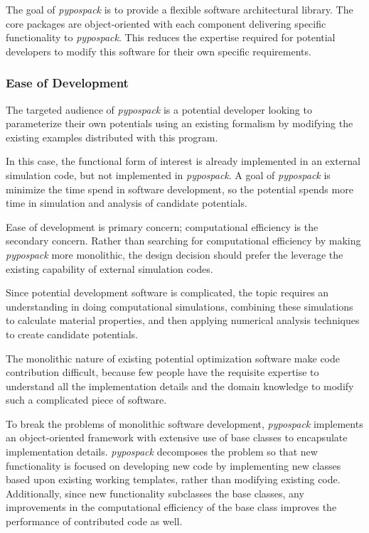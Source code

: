 The goal of \emph{pypospack} is to provide a flexible software architectural library.  The core packages are object-oriented with each component delivering specific functionality to \emph{pypospack}.  This reduces the expertise required for potential developers to modify this software for their own specific requirements.

\subsubsection{Ease of Development}

The targeted audience of \emph{pypospack} is a potential developer looking  to parameterize their own potentials using an existing formalism by modifying the existing examples distributed with this program.

In this case, the functional form of interest is already implemented in an external simulation code, but not implemented in \emph{pypospack}.  A goal of \emph{pypospack} is minimize the time spend in software development, so the potential spends more time in simulation and analysis of candidate potentials.

Ease of development is primary concern; computational efficiency is the secondary concern.  Rather than searching for computational efficiency by making \emph{pypospack} more monolithic, the design decision should prefer the leverage the existing capability of external simulation codes.

Since potential development software is complicated, the topic requires an understanding in doing computational simulations, combining these simulations to calculate material properties, and then applying numerical analysis techniques to create candidate potentials.

The monolithic nature of existing potential optimization software make code contribution difficult, because few people have the requisite expertise to understand all the implementation details and the domain knowledge to modify such a complicated piece of software.

To break the problems of monolithic software development, \emph{pypospack} implements an object-oriented framework with extensive use of base classes to encapsulate implementation details. \emph{pypospack} decomposes the problem so that new functionality is focused on developing new code by implementing new classes based upon existing working templates, rather than modifying existing code.  Additionally, since new functionality subclasses the base classes, any improvements in the computational efficiency of the base class improves the performance of contributed code as well.

